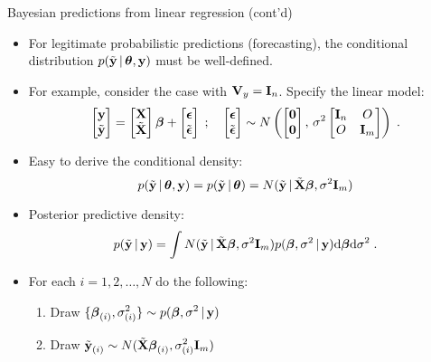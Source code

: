 \begin{frame}{Bayesian predictions from linear regression (cont'd)}
 
 \begin{itemize}\setlength{\itemsep}{0.cm}
  \item \vskip -2mm For legitimate probabilistic predictions (forecasting), the conditional distribution $p(\tilde{\textbf{y}}\,|\, \mbox{\boldmath $ \theta $}, \textbf{y})$ must be well-defined.
  
  \item For example, consider the case with $\textbf{V}_y = \textbf{I}_n$. Specify the linear model:
\begin{align*}
 \begin{bmatrix} \textbf{y} \\ \tilde{\textbf{y}} \end{bmatrix} = \begin{bmatrix} \textbf{X} \\ \tilde{\textbf{X}} \end{bmatrix}\mbox{\boldmath $ \beta $} + \begin{bmatrix} \mbox{\boldmath $\epsilon$} \\ \tilde{\mbox{\boldmath $\epsilon$}} \end{bmatrix}\;;\quad \begin{bmatrix} \mbox{\boldmath $\epsilon$} \\ \tilde{\mbox{\boldmath $\epsilon$}} \end{bmatrix} \sim N\left(\begin{bmatrix} \textbf{0} \\ \textbf{0} \end{bmatrix},\, \sigma^2\begin{bmatrix} \textbf{I}_n & O \\ O & \textbf{I}_m \end{bmatrix}\right)\; .  
\end{align*}
  
  \item Easy to derive the conditional density:
\[
 p(\tilde{\textbf{y}}\,|\, \mbox{\boldmath $ \theta $}, \textbf{y}) =  p(\tilde{\textbf{y}}\,|\, \mbox{\boldmath $ \theta $}) = N(\tilde{\textbf{y}}\,|\, \tilde{\textbf{X}}\mbox{\boldmath $ \beta $}, \sigma^2 \textbf{I}_m)
\]

\item Posterior predictive density:
\[
 p(\tilde{\textbf{y}}\,|\, \textbf{y}) = \int N(\tilde{\textbf{y}}\,|\, \tilde{\textbf{X}}\mbox{\boldmath $ \beta $}, \sigma^2 \textbf{I}_m) p(\mbox{\boldmath $ \beta $}, \sigma^2\,|\, \textbf{y}) \mbox{d}\mbox{\boldmath $ \beta $} \mbox{d}\sigma^2\; .
\]

\item For each $i=1,2,\ldots,N$ do the following: 
 \begin{enumerate}\setlength{\itemsep}{0.25cm}
  \item Draw $\displaystyle \{\mbox{\boldmath $ \beta $}_{(i)},\sigma^2_{(i)}\} \sim p(\mbox{\boldmath $ \beta $},\sigma^2\,|\, \textbf{y})$
  \item Draw $\displaystyle \tilde{\textbf{y}}_{(i)} \sim N(\tilde{\textbf{X}}\mbox{\boldmath $ \beta $}_{(i)}, \sigma^2_{(i)} \textbf{I}_m)$
 \end{enumerate}
 \end{itemize}

\end{frame}

